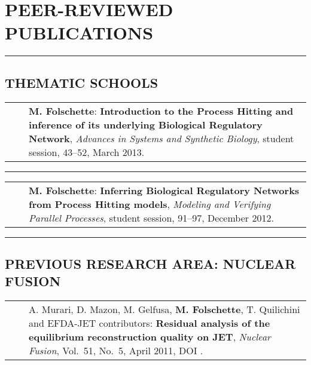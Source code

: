 \documentclass[11pt,a4paper,sans]{moderncv} %
\makeatletter
\renewcommand{\emph}{\textbf}
\newcommand{\myrule}{\vspace*{-2pt}\textcolor{color3}{\rule{\textwidth}{.5pt}}\vspace*{1pt}}
\newcommand{\mybluerule}{\vspace*{5pt}\textcolor{color1}{\rule{\textwidth}{.5pt}}\vspace*{-2pt}}
\newlength{\listitemsymbolwidthsep}
\newenvironment{publist}%
{\begin{tabular}{r@{}p{.935\textwidth}}\hspace{-\listitemsymbolwidthsep}\hspace{.45\hintscolumnwidth}}%
{\end{tabular}}
\newcommand{\newpub}[1]{\vspace{1pt}\begin{publist}\listitemsymbol~~&#1\end{publist}\vspace{1pt}}
\newenvironment{cvsplitsection}[1]{%
  \vspace{1cm}
  \section{#1}%
}{}
\newenvironment{cvsection}[1]{%
  \vspace{1cm}
  \begin{minipage}{\textwidth}
  \section{#1}%
}{%
  \end{minipage}
}
\newenvironment{cvsubsectionrule}[1]{%
  \begin{minipage}{\textwidth}
  \mybluerule
  \subsection{#1}%
}{%
  \end{minipage}
}
\newcommand{\vol}{Vol.\ }
\newcommand{\no}{No.\ }
\makeatother
\begin{document}
\begin{cvsplitsection}{PEER-REVIEWED PUBLICATIONS}
\begin{cvsubsectionrule}{THEMATIC SCHOOLS}

\newpub{\emph{M. Folschette}:
  \emph{Introduction to the Process Hitting and inference of its underlying Biological Regulatory Network},
  \textit{Advances in Systems and Synthetic Biology}, student session, 43--52, March 2013.}

\myrule

\newpub{\emph{M. Folschette}:
  \emph{Inferring Biological Regulatory Networks from Process Hitting models},
  \textit{Modeling and Verifying Parallel Processes}, student session, 91--97, December 2012.}

\end{cvsubsectionrule}




\begin{cvsubsectionrule}{PREVIOUS RESEARCH AREA: NUCLEAR FUSION}

\newpub{A. Murari, D. Mazon, M. Gelfusa, \emph{M. Folschette}, T. Quilichini and EFDA-JET contributors: %
  \emph{Residual analysis of the equilibrium reconstruction quality on JET}, \textit{Nuclear Fusion}, %
  \vol 51, \no 5, April 2011, DOI \httplink[10.1088/0029-5515/51/5/053012]{dx.doi.org/10.1088/0029-5515/51/5/053012}.}

\end{cvsubsectionrule}
\end{cvsplitsection}
\end{document}
